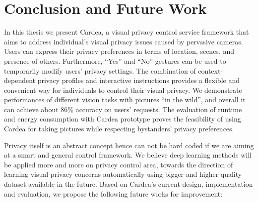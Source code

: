 \chapter{Conclusion and Future Work}\label{sec-conclusion}

In this thesis we present Cardea, a visual privacy control service framework that aims to address individual's visual privacy issues caused by pervasive cameras. Users can express their privacy preferences in terms of location, scenes, and presence of others. Furthermore, ``Yes'' and ``No'' gestures can be used to temporarily modify users' privacy settings. The combination of context-dependent privacy profiles and interactive instructions provides a flexible and convenient way for individuals to control their visual privacy. We demonstrate performances of different vision tasks with pictures ``in the wild'', and overall it can achieve about 86\% accuracy on users' requests. The evaluation of runtime and energy consumption with Cardea prototype proves the feasibility of using Cardea for taking pictures while respecting bystanders' privacy preferences.


Privacy itself is an abstract concept hence can not be hard coded if we are aiming at a smart and general control framework. We believe deep learning methods will be applied more and more on privacy control area, towards the direction of learning visual privacy concerns automatically using bigger and higher quality dataset available in the future. Based on Cardea's current design, implementation and evaluation, we propose the following future works for improvement:

